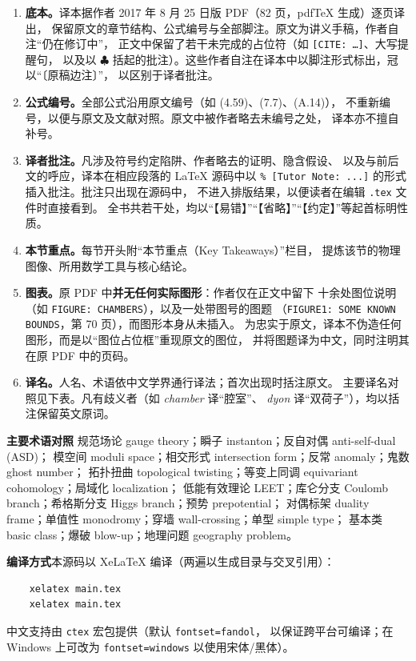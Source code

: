 \begin{enumerate}[leftmargin=2.2em, itemsep=4pt]
\item \textbf{底本。}译本据作者 2017 年 8 月 25 日版 PDF（82 页，pdfTeX 生成）逐页译出，
      保留原文的章节结构、公式编号与全部脚注。原文为讲义手稿，作者自注“仍在修订中”，
      正文中保留了若干未完成的占位符（如 \texttt{[CITE: \dots]}、大写提醒句，
      以及以 $\clubsuit$ 括起的批注）。这些作者自注在译本中以脚注形式标出，冠以“〔原稿边注〕”，
      以区别于译者批注。

\item \textbf{公式编号。}全部公式沿用原文编号（如 (4.59)、(7.7)、(A.14)），
      不重新编号，以便与原文及文献对照。原文中被作者略去未编号之处，
      译本亦不擅自补号。

\item \textbf{译者批注。}凡涉及符号约定陷阱、作者略去的证明、隐含假设、
      以及与前后文的呼应，译本在相应段落的 LaTeX 源码中以
      \verb|% [Tutor Note: ...]| 的形式插入批注。批注只出现在源码中，
      不进入排版结果，以便读者在编辑 \texttt{.tex} 文件时直接看到。
      全书共若干处，均以“【易错】”“【省略】”“【约定】”等起首标明性质。

\item \textbf{本节重点。}每节开头附“本节重点（Key Takeaways）”栏目，
      提炼该节的物理图像、所用数学工具与核心结论。

\item \textbf{图表。}原 PDF 中\textbf{并无任何实际图形}：作者仅在正文中留下
      十余处图位说明（如 \texttt{FIGURE: CHAMBERS}），以及一处带图号的图题
      （\texttt{FIGURE1: SOME KNOWN BOUNDS}，第 70 页），而图形本身从未插入。
      为忠实于原文，译本不伪造任何图形，而是以“图位占位框”重现原文的图位，
      并将图题译为中文，同时注明其在原 PDF 中的页码。

\item \textbf{译名。}人名、术语依中文学界通行译法；首次出现时括注原文。
      主要译名对照见下表。凡有歧义者（如 \emph{chamber} 译“腔室”、
      \emph{dyon} 译“双荷子”），均以括注保留英文原词。
\end{enumerate}

\vspace{0.6em}
\noindent\textbf{主要术语对照}\quad
规范场论 gauge theory；瞬子 instanton；反自对偶 anti-self-dual (ASD)；
模空间 moduli space；相交形式 intersection form；反常 anomaly；鬼数 ghost number；
拓扑扭曲 topological twisting；等变上同调 equivariant cohomology；局域化 localization；
低能有效理论 LEET；库仑分支 Coulomb branch；希格斯分支 Higgs branch；预势 prepotential；
对偶标架 duality frame；单值性 monodromy；穿墙 wall-crossing；单型 simple type；
基本类 basic class；爆破 blow-up；地理问题 geography problem。

\vspace{1.2em}
\noindent\textbf{编译方式}\quad 本源码以 Xe\LaTeX{} 编译（两遍以生成目录与交叉引用）：
\begin{verbatim}
    xelatex main.tex
    xelatex main.tex
\end{verbatim}
中文支持由 \texttt{ctex} 宏包提供（默认 \texttt{fontset=fandol}，
以保证跨平台可编译；在 Windows 上可改为 \texttt{fontset=windows} 以使用宋体/黑体）。

\clearpage
\tableofcontents
\clearpage
